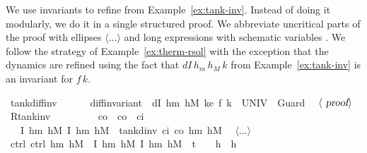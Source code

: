 \documentclass[envcountsame,envcountsect]{llncs}
\begin{document}
\begin{example}\label{ex:tank-rinv}
We use invariants to refine  from Example~\ref{ex:tank-inv}. Instead of doing it modularly, we do it in a single structured proof. We abbreviate uncritical parts of the proof with ellipses $\langle \dots\rangle$ and long expressions with schematic variables . We follow the strategy of Example~\ref{ex:therm-rsol} with the exception that the dynamics are refined using the fact that $dI\, h_m\, h_M\, k$ from Example~\ref{ex:tank-inv} is an invariant for $f\, k$.
\begin{isabellebody}
\isanewline
{}\isamarkupfalse%
\ tank{\isacharunderscore}diff{\isacharunderscore}inv{\isacharcolon}\isanewline
\ \ {\isachardoublequoteopen}{}\ {\isasymle}\ {\isasymtau}\ {\isasymLongrightarrow}\ diff{\isacharunderscore}invariant\ \ {\isasymlbrakk}dI\ h\isactrlsub m\ h\isactrlsub M\ k{\isasymrbrakk}\isactrlsub e\ {\isacharparenleft}f\ k{\isacharparenright}\ {\isacharbraceleft}{}{\isachardot}{\isachardot}{\isasymtau}{\isacharbraceright}\ UNIV\ {}\ Guard{\isachardoublequoteclose}\isanewline
\ \ $\langle \isa{proof}\rangle$\isanewline
\isanewline
{}\isamarkupfalse%
\ R{\isacharunderscore}tank{\isacharunderscore}inv{\isacharcolon}\isanewline
\ \ \ {\isachardoublequoteopen}{}\ {\isasymle}\ {\isasymtau}{\isachardoublequoteclose}\ \ {\isachardoublequoteopen}{}\ {\isacharless}\ c\isactrlsub o{\isachardoublequoteclose}\ \ {\isachardoublequoteopen}c\isactrlsub o\ {\isacharless}\ c\isactrlsub i{\isachardoublequoteclose}\isanewline
\ \ \ {\isachardoublequoteopen}\isactrlbold {\isacharbrackleft}I\ h\isactrlsub m\ h\isactrlsub M{\isacharcomma}\ I\ h\isactrlsub m\ h\isactrlsub M\isactrlbold {\isacharbrackright}\ {\isasymge}\ tank{\isacharunderscore}dinv\ c\isactrlsub i\ c\isactrlsub o\ h\isactrlsub m\ h\isactrlsub M\ {\isasymtau}{\isachardoublequoteclose}\isanewline
{}\isamarkupfalse%
{\isacharminus}\isanewline
{}\ $\langle\dots\rangle$\isanewline
\ \ \isamarkupfalse%
\ ctrl{\isacharcolon}\ {\isachardoublequoteopen}ctrl\ h\isactrlsub m\ h\isactrlsub M\ {\isasymle}\ \isactrlbold {\isacharbrackleft}I\ h\isactrlsub m\ h\isactrlsub M{\isacharcomma}\ I\ h\isactrlsub m\ h\isactrlsub M\ {\isasymand}\ t\ {\isacharequal}\ {}\ {\isasymand}\ h\ {\isacharequal}\ h\isactrlbold {\isacharbrackright}{\isachardoublequoteclose}\isanewline 

\end{isabellebody}
\end{example}
\end{document}
